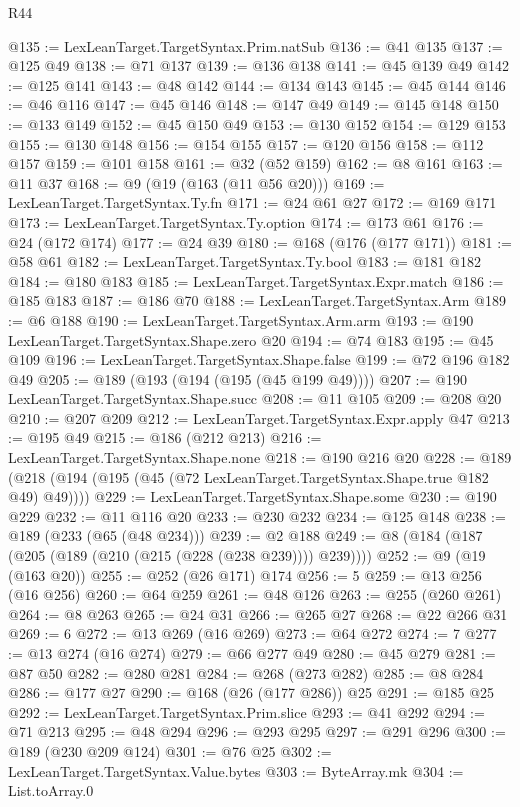\begin{lexlean}{R44}
\begin{coremodule}
@135 := LexLeanTarget.TargetSyntax.Prim.natSub
@136 := @41 @135
@137 := @125 @49
@138 := @71 @137
@139 := @136 @138
@141 := @45 @139 @49
@142 := @125 @141
@143 := @48 @142
@144 := @134 @143
@145 := @45 @144
@146 := @46 @116
@147 := @45 @146
@148 := @147 @49
@149 := @145 @148
@150 := @133 @149
@152 := @45 @150 @49
@153 := @130 @152
@154 := @129 @153
@155 := @130 @148
@156 := @154 @155
@157 := @120 @156
@158 := @112 @157
@159 := @101 @158
@161 := @32 (@52 @159)
@162 := @8 @161
@163 := @11 @37
@168 := @9 (@19 (@163 (@11 @56 @20)))
@169 := LexLeanTarget.TargetSyntax.Ty.fn
@171 := @24 @61 @27
@172 := @169 @171
@173 := LexLeanTarget.TargetSyntax.Ty.option
@174 := @173 @61
@176 := @24 (@172 @174)
@177 := @24 @39
@180 := @168 (@176 (@177 @171))
@181 := @58 @61
@182 := LexLeanTarget.TargetSyntax.Ty.bool
@183 := @181 @182
@184 := @180 @183
@185 := LexLeanTarget.TargetSyntax.Expr.match
@186 := @185 @183
@187 := @186 @70
@188 := LexLeanTarget.TargetSyntax.Arm
@189 := @6 @188
@190 := LexLeanTarget.TargetSyntax.Arm.arm
@193 := @190 LexLeanTarget.TargetSyntax.Shape.zero @20
@194 := @74 @183
@195 := @45 @109
@196 := LexLeanTarget.TargetSyntax.Shape.false
@199 := @72 @196 @182 @49
@205 := @189 (@193 (@194 (@195 (@45 @199 @49))))
@207 := @190 LexLeanTarget.TargetSyntax.Shape.succ
@208 := @11 @105
@209 := @208 @20
@210 := @207 @209
@212 := LexLeanTarget.TargetSyntax.Expr.apply @47
@213 := @195 @49
@215 := @186 (@212 @213)
@216 := LexLeanTarget.TargetSyntax.Shape.none
@218 := @190 @216 @20
@228 := @189 (@218 (@194 (@195 (@45 (@72 LexLeanTarget.TargetSyntax.Shape.true @182 @49) @49))))
@229 := LexLeanTarget.TargetSyntax.Shape.some
@230 := @190 @229
@232 := @11 @116 @20
@233 := @230 @232
@234 := @125 @148
@238 := @189 (@233 (@65 (@48 @234)))
@239 := @2 @188
@249 := @8 (@184 (@187 (@205 (@189 (@210 (@215 (@228 (@238 @239)))) @239))))
@252 := @9 (@19 (@163 @20))
@255 := @252 (@26 @171) @174
@256 := 5
@259 := @13 @256 (@16 @256)
@260 := @64 @259
@261 := @48 @126
@263 := @255 (@260 @261)
@264 := @8 @263
@265 := @24 @31
@266 := @265 @27
@268 := @22 @266 @31
@269 := 6
@272 := @13 @269 (@16 @269)
@273 := @64 @272
@274 := 7
@277 := @13 @274 (@16 @274)
@279 := @66 @277 @49
@280 := @45 @279
@281 := @87 @50
@282 := @280 @281
@284 := @268 (@273 @282)
@285 := @8 @284
@286 := @177 @27
@290 := @168 (@26 (@177 @286)) @25
@291 := @185 @25
@292 := LexLeanTarget.TargetSyntax.Prim.slice
@293 := @41 @292
@294 := @71 @213
@295 := @48 @294
@296 := @293 @295
@297 := @291 @296
@300 := @189 (@230 @209 @124)
@301 := @76 @25
@302 := LexLeanTarget.TargetSyntax.Value.bytes
@303 := ByteArray.mk
@304 := List.toArray.{0}

\end{coremodule}
\end{lexlean}
